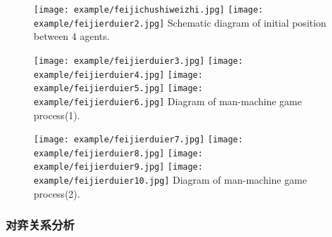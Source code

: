 \begin{figure}[!htbp]
	\centering
	\subcaptionbox{\label{fig:duoduiduo1-2:a}}
	{\texttt{[image: example/feijichushiweizhi.jpg]}}
	\hspace{0.5em}
	\subcaptionbox{\label{fig:duoduiduo1-2:b}}
	{\texttt{[image: example/feijierduier2.jpg]}}
	{Schematic diagram of initial position between 4 agents.}
	\label{fig:duoduiduo1-2}
\end{figure}
\begin{figure}[!htbp]
	\centering
	\subcaptionbox{\label{fig2:fig:duoduiduo3-6:a}}
	{\texttt{[image: example/feijierduier3.jpg]}}
	\hspace{0.5em}
	\subcaptionbox{\label{fig:duoduiduo3-6:b}}
	{\texttt{[image: example/feijierduier4.jpg]}}
	\newline
	\centering
	\subcaptionbox{\label{fig:duoduiduo3-6:c}}
	{\texttt{[image: example/feijierduier5.jpg]}}
	\hspace{0.5em}
	\subcaptionbox{\label{fig:duoduiduo3-6:d}}
	{\texttt{[image: example/feijierduier6.jpg]}}
	{Diagram of man-machine game process(1).}
	\label{fig:duoduiduo3-6}
\end{figure}
\begin{figure}[!htbp]
	\centering
	\subcaptionbox{\label{fig:duoduiduo9-10:a}}
	{\texttt{[image: example/feijierduier7.jpg]}}
	\hspace{0.5em}
	\subcaptionbox{\label{fig:duoduiduo9-10:b}}
	{\texttt{[image: example/feijierduier8.jpg]}}
	\newline
	\centering
	\subcaptionbox{\label{fig2:fig:duoduiduo9-10:c}}
	{\texttt{[image: example/feijierduier9.jpg]}}
	\hspace{0.5em}
	\subcaptionbox{\label{fig:duoduiduo9-10:d}}
	{\texttt{[image: example/feijierduier10.jpg]}}
	{Diagram of man-machine game process(2).}
	\label{fig:duoduiduo9-10}
\end{figure}
\subsubsection{对弈关系分析}

